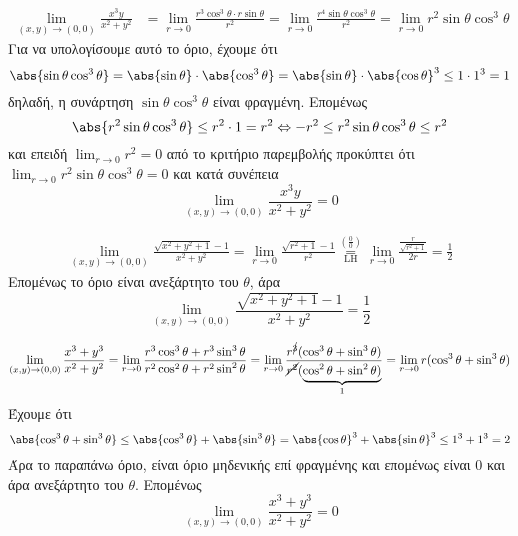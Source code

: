 \documentclass[a4paper,11pt]{report}
\begin{document}
  \begin{example}
    \begin{align*}
      \lim\limits_{(x,y)\to (0, 0)} \frac{x^{3}y}{x^{2}+y^{2}} &= 
      \lim_{r \to 0} \frac{r^{3} \cos^{3}{\theta} \cdot r 
        \sin{\theta}}{r^{2}} = \lim_{r \to 0} \frac{r^{4} \sin{\theta} 
      \cos^{3}{\theta}}{r^{2}} = 
      \lim_{r \to 0} r^{2} \sin{\theta} \cos^{3}{\theta} 
    \end{align*}
    Για να υπολογίσουμε αυτό το όριο, έχουμε ότι
    \[
      \abs{\sin{\theta} \cos^{3}{\theta}} = \abs{\sin{\theta}} \cdot 
      \abs{\cos^{3}{\theta}} = \abs{\sin{\theta}} \cdot \abs{\cos{\theta}}^{3} \leq 
      1 \cdot 1^{3} = 1 
    \] 
    δηλαδή, η συνάρτηση $ \sin{\theta} \cos^{3}{\theta} $ είναι φραγμένη.
    Επομένως
    \[ 
      \abs{r^{2} \sin{\theta} \cos^{3}{\theta}} \leq r^{2} \cdot 1 = r^{2} \Leftrightarrow 
      -r^{2} \leq r^{2} \sin{\theta} \cos^{3}{\theta} \leq r^{2}
    \] 
    και επειδή $ \lim_{r \to 0} r^{2} = 0 $ από το κριτήριο παρεμβολής προκύπτει ότι 
    $ \lim_{r \to 0} r^{2} \sin{\theta} \cos^{3}{\theta} = 0 $ και κατά συνέπεια
    \[
      \lim\limits_{(x,y)\to (0,0)} \frac{x^{3}y}{x^{2}+y^{2}} = 0
    \] 
  \end{example}

  \begin{example}
    \begin{align*}
      \lim\limits_{(x,y)\to (0, 0)} \frac{\sqrt{x^{2}+y^{2}+1}-1}
      {x^{2}+y^{2}} = \lim_{r \to 0} \frac{\sqrt{r^{2}+1} -1}{r^{2}} 
      \overset{\left(\frac{0}{0}\right)}{\underset{\text{LH}}{=}} 
      \lim_{r \to 0} \frac{\frac{r}{\sqrt{r^{2}+1}}}{2r} = \frac{1}{2}
    \end{align*}
    Επομένως το όριο είναι ανεξάρτητο του $\theta$, άρα 
    \[
      \lim\limits_{(x,y)\to (0, 0)} 
      \frac{\sqrt{x^{2}+y^{2}+1} -1}{x^{2}+y^{2}} = \frac{1}{2} 
    \] 
  \end{example}

  \begin{example}
    \[ 
      \lim\limits_{(x,y)\to (0, 0)} \frac{x^{3}+y^{3}}{x^{2}+y^{2}} = \lim_{r \to 0}
      \frac{r^{3} \cos^{3}{\theta} + r^{3} \sin^{3}{\theta}}{r^{2} \cos^{2}{\theta} +
        r^{2} \sin^{2}{\theta}} = \lim_{r \to 0} \frac{r^{\cancel{3}}(\cos^{3}{\theta} +
        \sin^{3}{\theta})}{\cancel{r^{2}}(\underbrace{\cos^{2}{\theta} +
      \sin^{2}{\theta})}_{1}} = 
      \lim_{r \to 0} r(\cos^{3}{\theta} + \sin^{3}{\theta}) 
    \] 
    Έχουμε ότι
    \[
      \abs{\cos^{3}{\theta} + \sin^{3}{\theta}} \leq \abs{\cos^{3}{\theta}} + 
      \abs{\sin^{3}{\theta}} = \abs{\cos{\theta} }^{3} + \abs{\sin{\theta} }^{3} \leq 
      1^{3} + 1^{3} = 2
    \] 
    Άρα το παραπάνω όριο, είναι όριο μηδενικής επί φραγμένης και επομένως είναι 0 και άρα
    ανεξάρτητο του $\theta$. Επομένως 
    \[
      \lim\limits_{(x,y)\to (0, 0)} \frac{x^{3}+y^{3}}{x^{2}+y^{2}} = 0 
    \] 
  \end{example}
\end{document}
